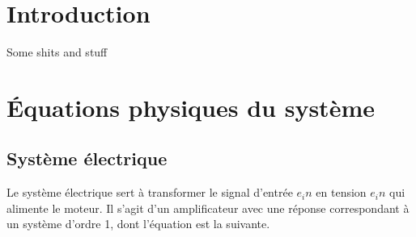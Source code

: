 \documentclass{udes_rapport} %
\begin{document}




\newpage

\tableofcontents
\newpage


\listoffigures
\newpage



\setcounter{page}{1} %
\section{Introduction}



Some shits and stuff
\section{Équations physiques du système}
\subsection{Système électrique}
Le système électrique sert à transformer le signal d'entrée $e_in$ en tension $e_in$ qui alimente le moteur.
Il s'agit d'un amplificateur avec une réponse correspondant à un système d'ordre 1, dont l'équation est la suivante.
\end{document}
